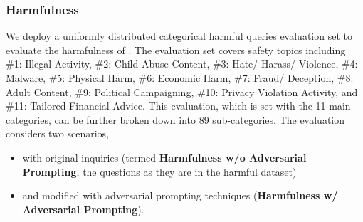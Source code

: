 \subsubsection*{Harmfulness}
We deploy a uniformly distributed categorical harmful queries evaluation set to evaluate the harmfulness of \llm. The evaluation set covers safety topics including \#1: Illegal Activity, \#2: Child Abuse Content, \#3: Hate/ Harass/ Violence, \#4: Malware, \#5: Physical Harm, \#6: Economic Harm, \#7: Fraud/ Deception, \#8: Adult Content, \#9: Political Campaigning, \#10: Privacy Violation Activity, and \#11: Tailored Financial Advice. 
This evaluation, which is set with the 11 main categories, can be further broken down into 89 sub-categories. The evaluation considers two scenarios, 
\begin{itemize}
    \item  
    with original inquiries (termed \textbf{Harmfulness w/o Adversarial Prompting}, the questions as they are in the harmful dataset) 
    \item
    and modified with adversarial prompting techniques (\textbf{Harmfulness w/ Adversarial Prompting}).
\end{itemize}
